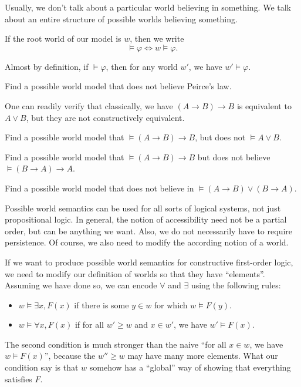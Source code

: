 \documentclass[a4paper]{article}
\begin{document}
Usually, we don't talk about a particular world believing in something. We talk about an entire structure of possible worlds believing something.
\begin{notation}
  If the root world of our model is $w$, then we write
  \[
    \vDash \varphi \Longleftrightarrow w \vDash \varphi.
  \]
\end{notation}
Almost by definition, if $\vDash \varphi$, then for any world $w'$, we have $w' \vDash \varphi$.

\begin{ex}
  Find a possible world model that does not believe Peirce's law.
\end{ex}

One can readily verify that classically, we have $(A \to B) \to B$ is equivalent to $A \vee B$, but they are not constructively equivalent.
\begin{ex}
  Find a possible world model that $\vDash (A \to B) \to B$, but does not $\vDash A \vee B$.
\end{ex}

\begin{ex}
  Find a possible world model that $\vDash (A \to B) \to B$ but does not believe $\vDash (B \to A) \to A$.
\end{ex}

\begin{ex}
  Find a possible world model that does not believe in $\vDash (A \to B) \vee (B \to A)$.
\end{ex}

Possible world semantics can be used for all sorts of logical systems, not just propositional logic. In general, the notion of accessibility need not be a partial order, but can be anything we want. Also, we do not necessarily have to require persistence. Of course, we also need to modify the according notion of a world.

\begin{eg}
  If we want to produce possible world semantics for constructive first-order logic, we need to modify our definition of worlds so that they have ``elements''. Assuming we have done so, we can encode $\forall$ and $\exists$ using the following rules:
  \begin{itemize}
    \item $w \vDash \exists x, F(x)$ if there is some $y \in w$ for which $w \vDash F(y)$.
    \item $w \vDash \forall x, F(x)$ if for all $w' \geq w$ and $x \in w'$, we have $w' \vDash F(x)$.
  \end{itemize}
  The second condition is much stronger than the naive ``for all $x \in w$, we have $w \vDash F(x)$'', because the $w'' \geq w$ may have many more elements. What our condition say is that $w$ somehow has a ``global'' way of showing that everything satisfies $F$.
\end{eg}
\end{document}

